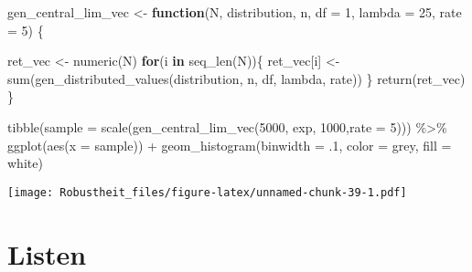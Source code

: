 \documentclass[
]{book}
\newenvironment{Shaded}{\begin{snugshade}}{\end{snugshade}}
\newcommand{\AttributeTok}[1]{\textcolor[rgb]{0.77,0.63,0.00}{#1}}
\newcommand{\ControlFlowTok}[1]{\textcolor[rgb]{0.13,0.29,0.53}{\textbf{#1}}}
\newcommand{\DecValTok}[1]{\textcolor[rgb]{0.00,0.00,0.81}{#1}}
\newcommand{\FunctionTok}[1]{\textcolor[rgb]{0.00,0.00,0.00}{#1}}
\newcommand{\NormalTok}[1]{#1}
\newcommand{\OtherTok}[1]{\textcolor[rgb]{0.56,0.35,0.01}{#1}}
\newcommand{\SpecialCharTok}[1]{\textcolor[rgb]{0.00,0.00,0.00}{#1}}
\newcommand{\StringTok}[1]{\textcolor[rgb]{0.31,0.60,0.02}{#1}}
\begin{document}
\begin{Shaded}
\begin{Highlighting}[]
\NormalTok{gen\_central\_lim\_vec }\OtherTok{\textless{}{-}} \ControlFlowTok{function}\NormalTok{(N, }
\NormalTok{                                distribution,}
\NormalTok{                                n,}
                                \AttributeTok{df =} \DecValTok{1}\NormalTok{,}
                                \AttributeTok{lambda =} \DecValTok{25}\NormalTok{,}
                                \AttributeTok{rate =} \DecValTok{5}\NormalTok{) \{}
  
\NormalTok{  ret\_vec }\OtherTok{\textless{}{-}} \FunctionTok{numeric}\NormalTok{(N)}
  \ControlFlowTok{for}\NormalTok{(i }\ControlFlowTok{in} \FunctionTok{seq\_len}\NormalTok{(N))\{}
\NormalTok{    ret\_vec[i] }\OtherTok{\textless{}{-}} \FunctionTok{sum}\NormalTok{(}\FunctionTok{gen\_distributed\_values}\NormalTok{(distribution,}
\NormalTok{                                      n,}
\NormalTok{                                      df,}
\NormalTok{                                      lambda,}
\NormalTok{                                      rate))}
\NormalTok{  \}}
  \FunctionTok{return}\NormalTok{(ret\_vec)}
\NormalTok{\}}

\FunctionTok{tibble}\NormalTok{(}\AttributeTok{sample =} \FunctionTok{scale}\NormalTok{(}\FunctionTok{gen\_central\_lim\_vec}\NormalTok{(}\DecValTok{5000}\NormalTok{, }\StringTok{\textquotesingle{}exp\textquotesingle{}}\NormalTok{, }\DecValTok{1000}\NormalTok{,}\AttributeTok{rate =} \DecValTok{5}\NormalTok{))) }\SpecialCharTok{\%\textgreater{}\%} 
  \FunctionTok{ggplot}\NormalTok{(}\FunctionTok{aes}\NormalTok{(}\AttributeTok{x =}\NormalTok{ sample)) }\SpecialCharTok{+}
  \FunctionTok{geom\_histogram}\NormalTok{(}\AttributeTok{binwidth =}\NormalTok{ .}\DecValTok{1}\NormalTok{,}
                 \AttributeTok{color =} \StringTok{\textquotesingle{}grey\textquotesingle{}}\NormalTok{,}
                 \AttributeTok{fill =} \StringTok{\textquotesingle{}white\textquotesingle{}}\NormalTok{)}
\end{Highlighting}
\end{Shaded}

\texttt{[image: Robustheit\_files/figure-latex/unnamed-chunk-39-1.pdf]}

\hypertarget{listen}{%
\chapter{Listen}\label{listen}}
\end{document}
